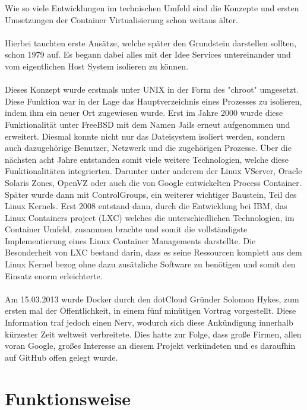 \documentclass[12pt,toc=bib,toc=listof]{scrreprt}
\begin{document}
Wie so viele Entwicklungen im technischen Umfeld sind die Konzepte und ersten Umsetzungen der Container Virtualisierung schon weitaus älter.\\
\\
Hierbei tauchten erste Ansätze, welche später den Grundstein darstellen sollten, schon 1979 auf.
Es begann dabei alles mit der Idee Services untereinander und vom eigentlichen Host System isolieren zu können.\\
\\
Dieses Konzept wurde erstmals unter UNIX in der Form des "chroot" umgesetzt.
Diese Funktion war in der Lage das Hauptverzeichnis eines Prozesses zu isolieren, indem ihm ein neuer Ort zugewiesen wurde. 
Erst im Jahre 2000 wurde diese Funktionalität unter FreeBSD mit dem Namen Jails erneut aufgenommen und erweitert.
Diesmal konnte nicht nur das Dateisystem isoliert werden, sondern auch dazugehörige Benutzer, Netzwerk und die zugehörigen Prozesse.
Über die nächsten acht Jahre entstanden somit viele weitere Technologien, welche diese Funktionalitäten integrierten. Darunter unter anderem der
Linux VServer, Oracle Solaris Zones, OpenVZ oder auch die von Google entwickelten Process Container.
Später wurde dann mit ControlGroups, ein weiterer wichtiger Baustein, Teil des Linux Kernels. 
Erst 2008 entstand dann, durch die Entwicklung bei IBM, das Linux Containers project (LXC) welches die unterschiedlichen Technologien, im Container Umfeld, zusammen brachte und somit die vollständigste Implementierung eines Linux Container Managements darstellte.
Die Besonderheit von LXC bestand darin, dass es seine Ressourcen komplett aus dem Linux Kernel bezog ohne dazu zusätzliche Software zu benötigen und somit den Einsatz enorm erleichterte.\\
\\
Am 15.03.2013 wurde Docker durch den dotCloud Gründer Solomon Hykes, zum ersten mal der Öffentlichkeit, in einem fünf minütigen Vortrag vorgestellt.
Diese Information traf jedoch einen Nerv, wodurch sich diese Ankündigung innerhalb kürzester Zeit weltweit verbreitete.
Dies hatte zur Folge, dass große Firmen, allen voran Google, großes Interesse an diesem Projekt verkündeten und es daraufhin auf GitHub offen gelegt wurde.


\section{Funktionsweise}
\end{document}
